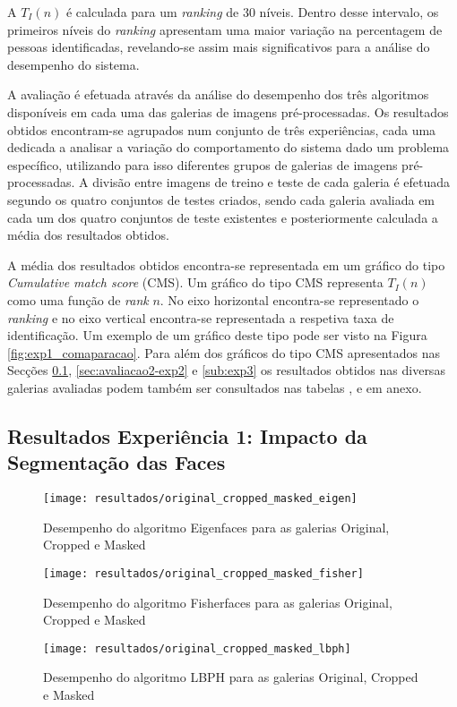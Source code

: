 A $T_{I}(n)$ é calculada para um \textit{ranking} de 30 níveis. Dentro desse intervalo, os primeiros níveis do \textit{ranking} apresentam uma maior variação na percentagem de pessoas identificadas, revelando-se assim mais significativos para a análise do desempenho do sistema.

A avaliação é efetuada através da análise do desempenho dos três algoritmos disponíveis em cada uma das galerias de imagens pré-processadas. Os resultados obtidos encontram-se agrupados num conjunto de três experiências, cada uma dedicada a analisar a variação do comportamento do sistema dado um problema específico, utilizando para isso diferentes grupos de galerias de imagens pré-processadas. A divisão entre imagens de treino e teste de cada galeria é efetuada segundo os quatro conjuntos de testes criados, sendo cada galeria avaliada em cada um dos quatro conjuntos de teste existentes e posteriormente calculada a média dos resultados obtidos.

A média dos resultados obtidos encontra-se representada em um gráfico do tipo \textit{Cumulative match score} (CMS). Um gráfico do tipo CMS representa $T_{I}(n)$ como uma função de \textit{rank} $n$. No eixo horizontal encontra-se representado o \textit{ranking} e no eixo vertical encontra-se representada a respetiva taxa de identificação. Um exemplo de um gráfico deste tipo pode ser visto na Figura \ref{fig:exp1_comaparacao}. Para além dos gráficos do tipo CMS apresentados nas Secções \ref{sub:exp1}, \ref{sec:avaliacao2-exp2} e \ref{sub:exp3} os resultados obtidos nas diversas galerias avaliadas podem também ser consultados nas tabelas \label{tab:media_eigen}, \label{tab:media_fisher} e \label{tab:media_lbph} em anexo.

\subsection{Resultados Experiência 1: Impacto da Segmentação das Faces} \label{sub:exp1}

        \begin{figure}[ht]
                \centering
                \texttt{[image: resultados/original\_cropped\_masked\_eigen]}
                \caption{Desempenho do algoritmo Eigenfaces para as galerias Original, Cropped e Masked}
                \label{fig:original_cropped_masked_eigen}
        \end{figure}%

        \begin{figure}[p]
                \centering
                \texttt{[image: resultados/original\_cropped\_masked\_fisher]}
                \caption{Desempenho do algoritmo Fisherfaces para as galerias Original, Cropped e Masked}
                \label{fig:original_cropped_masked_fisher}
                \centering
                \texttt{[image: resultados/original\_cropped\_masked\_lbph]}
                \caption{Desempenho do algoritmo LBPH para as galerias Original, Cropped e Masked}
                \label{fig:original_cropped_masked_lbph}
        \end{figure}%
        
